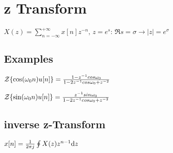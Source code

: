 \section{z Transform}
$X(z) = \sum_{n=-\infty}^{+\infty} x[n] z^{-n}$, $z=e^s$: $\Re s = \sigma \to |z|=e^{\sigma}$

\subsection*{Examples}

$\mathcal Z\{\cos(\omega_0 n) u[n]\}=\frac{1-z^{-1}cos\omega_0}{1-2z^{-1}cos\omega_0+z^{-2}}$

$\mathcal Z\{\sin(\omega_0 n) u[n]\}=\frac{z^{-1}sin\omega_0}{1-2z^{-1}cos\omega_0+z^{-2}}$


\subsection*{inverse z-Transform}

$x[n]=\frac{1}{2\pi j}\oint X(z)z^{n-1}\mathrm{d} z$